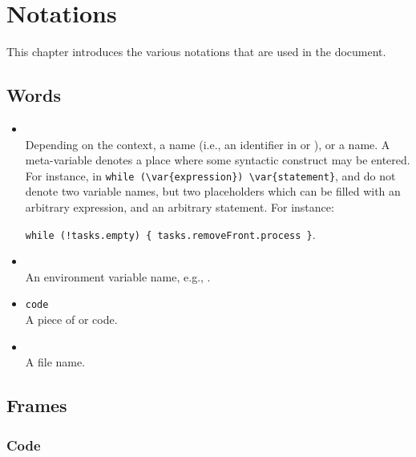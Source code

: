 
\chapter{Notations}
\label{sec:notations}

This chapter introduces the various notations that are used in the
document.

\section{Words}

\begin{itemize}
\item {}\\
  Depending on the context, a  name (i.e., an identifier
  in \Cxx or \us), or a  name.  A meta-variable
  denotes a place where some syntactic construct may be entered.  For
  instance, in \lstinline|while (\var{expression}) \var{statement}|,
   and  do not denote two variable
  names, but two placeholders which can be filled with an arbitrary
  expression, and an arbitrary statement.  For instance:

  \lstinline|while (!tasks.empty) { tasks.removeFront.process }|.

\item {}\\
  An environment variable name, e.g., .
\item \lstinline|code|\\
  A piece of \us or \Cxx code.
\item {}\\
  A file name.
\end{itemize}

\section{Frames}

\subsection{\Cxx Code}
\label{sec:notations:cxx}

